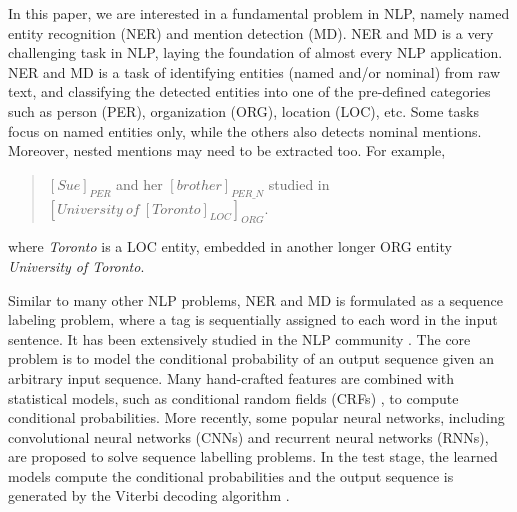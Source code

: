 \documentclass[11pt,a4paper]{article}
\begin{document}
In this paper, we are interested in a fundamental problem in NLP, namely named entity recognition (NER) and mention detection (MD). NER and MD is a very challenging task in NLP, laying the foundation of almost every NLP application.
NER and MD is a task of identifying entities (named and/or nominal) from raw text, and classifying the detected entities into one of the pre-defined categories such as person (PER), organization (ORG), location (LOC), etc. Some tasks focus on named entities only, 
while the others also detects nominal mentions. %
Moreover, nested mentions may need to be extracted too. For example, 
\begin{quote}
	\small
	$[Sue]_{PER}$ and her $[brother]_{PER\_N}$ studied in ${[University\ of\ {[Toronto]}_{LOC}]}_{ORG}$. 
\end{quote}
where {\it Toronto} is a LOC entity, embedded in another longer ORG entity {\it University of Toronto}.

Similar to many other NLP problems, NER and MD is formulated as a sequence labeling problem, where a tag is sequentially assigned to each word in the input sentence. It has been extensively studied in the NLP community \cite{borthwick1998exploiting}. The core problem is to model the conditional probability of an output sequence given an arbitrary input sequence. Many hand-crafted features are combined with statistical models, such as conditional random fields (CRFs) \cite{nguyen2010kernel}, to compute conditional probabilities. More recently, some popular neural networks, including convolutional neural networks (CNNs) and recurrent neural networks (RNNs), are proposed to solve sequence labelling problems.
In the test stage, the learned models compute the conditional probabilities and the output sequence is generated by the 
Viterbi decoding algorithm \cite{Viterbi1967err}. 
\end{document}
